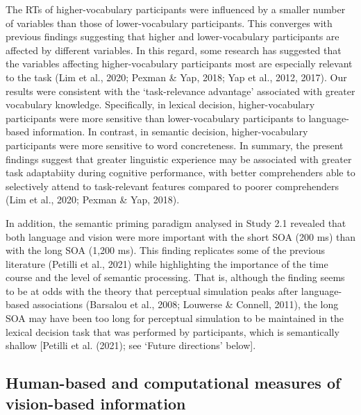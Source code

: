 \documentclass[
  12pt,
  man,floatsintext]{apa7}
\begin{document}
The RTs of higher-vocabulary participants were influenced by a smaller number of variables than those of lower-vocabulary participants. This converges with previous findings suggesting that higher and lower-vocabulary participants are affected by different variables. In this regard, some research has suggested that the variables affecting higher-vocabulary participants most are especially relevant to the task (Lim et al., 2020; Pexman \& Yap, 2018; Yap et al., 2012, 2017). Our results were consistent with the `task-relevance advantage' associated with greater vocabulary knowledge. Specifically, in lexical decision, higher-vocabulary participants were more sensitive than lower-vocabulary participants to language-based information. In contrast, in semantic decision, higher-vocabulary participants were more sensitive to word concreteness. In summary, the present findings suggest that greater linguistic experience may be associated with greater task adaptabiity during cognitive performance, with better comprehenders able to selectively attend to task-relevant features compared to poorer comprehenders (Lim et al., 2020; Pexman \& Yap, 2018).

In addition, the semantic priming paradigm analysed in Study 2.1 revealed that both language and vision were more important with the short SOA (200 ms) than with the long SOA (1,200 ms). This finding replicates some of the previous literature (Petilli et al., 2021) while highlighting the importance of the time course and the level of semantic processing. That is, although the finding seems to be at odds with the theory that perceptual simulation peaks after language-based associations (Barsalou et al., 2008; Louwerse \& Connell, 2011), the long SOA may have been too long for perceptual simulation to be maintained in the lexical decision task that was performed by participants, which is semantically shallow {[}Petilli et al. (2021); see `Future directions' below{]}.

\hypertarget{human-based-and-computational-measures-of-vision-based-information-1}{%
\subsection{Human-based and computational measures of vision-based information}\label{human-based-and-computational-measures-of-vision-based-information-1}}
\end{document}
